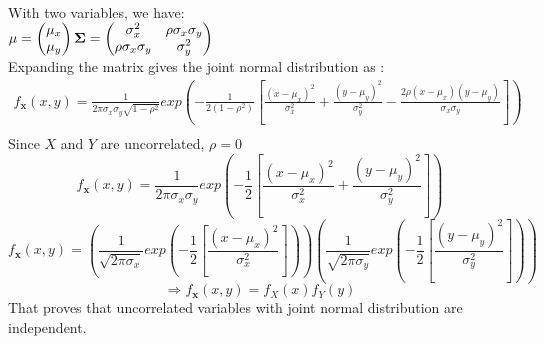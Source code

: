 \documentclass{article}
\begin{document}
\begin{enumerate}[(i)]
\begin{enumerate}[(a)]
\begin{align}
            \end{align}
            With two variables, we have:\\
            $\mathbf{\mu} = \begin{pmatrix}
                \mu_x\\
                \mu_y
            \end{pmatrix}\\
            \mathbf{\Sigma} = 
            \begin{pmatrix}
                 \sigma_{x}^2 & \rho\sigma_{x}\sigma_{y} \\
                 \rho\sigma_{x}\sigma_{y} & \sigma_{y}^2
             \end{pmatrix} $\\
        Expanding the matrix gives the joint normal distribution as :\\
        \begin{align}
            f_{\mathbf{x}}(x, y) = \frac{1}{2\pi\sigma_x\sigma_y \sqrt{1-\rho^2}} exp\left(- \frac{1}{2(1-\rho^2)}\left[\frac{(x-\mu_x)^2}{\sigma_x^2} + \frac{(y-\mu_y)^2}{\sigma_y^2}- \frac{2\rho(x - \mu_x)(y - \mu_y)}{\sigma_x\sigma_y}\right]\right) \nonumber \\
        \end{align}
        \newpage
        Since $X$ and $Y$ are uncorrelated, $\rho = 0$\\
        \begin{equation}
            f_{\mathbf{x}}(x, y) = \frac{1}{2\pi\sigma_x\sigma_y} exp\left(- \frac{1}{2}\left[\frac{(x-\mu_x)^2}{\sigma_x^2} + \frac{(y-\mu_y)^2}{\sigma_y^2} \right]\right) \nonumber
        \end{equation}
        \begin{equation}
            f_{\mathbf{x}}(x, y) = \left(\frac{1}{\sqrt{2\pi\sigma_x}} exp\left(- \frac{1}{2}\left[\frac{(x-\mu_x)^2}{\sigma_x^2}\right]\right)\right) \left(\frac{1}{\sqrt{2\pi\sigma_y}} exp\left(- \frac{1}{2}\left[\frac{(y-\mu_y)^2}{\sigma_y^2}\right]\right)\right) \nonumber
        \end{equation}
        \begin{equation}
            \Longrightarrow
            f_{\mathbf{x}}(x, y) = f_{X}(x)f_{Y}(y) \nonumber
        \end{equation}
        That proves that uncorrelated variables with joint normal distribution are independent.


\end{enumerate}
\end{enumerate}
\end{document}
